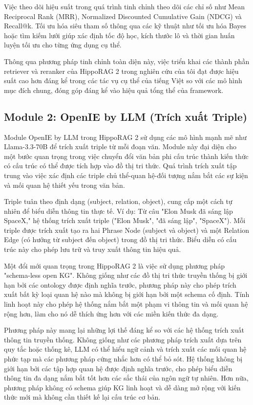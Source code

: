 \documentclass[../main.tex]{subfiles}
\begin{document}
Việc theo dõi hiệu suất trong quá trình tinh chỉnh theo dõi các chỉ số như Mean Reciprocal Rank (MRR), Normalized Discounted Cumulative Gain (NDCG) và Recall@k. Tối ưu hóa siêu tham số thông qua các kỹ thuật như tối ưu hóa Bayes hoặc tìm kiếm lưới giúp xác định tốc độ học, kích thước lô và thời gian huấn luyện tối ưu cho từng ứng dụng cụ thể.

Thông qua phương pháp tinh chỉnh toàn diện này, việc triển khai các thành phần retriever và reranker của HippoRAG 2 trong nghiên cứu của tôi đạt được hiệu suất cao hơn đáng kể trong các tác vụ cụ thể của tiếng Việt so với các mô hình mục đích chung, đóng góp đáng kể vào hiệu quả tổng thể của framework.

\subsection{Module 2: OpenIE by LLM (Trích xuất Triple)}
Module OpenIE by LLM trong HippoRAG 2 sử dụng các mô hình mạnh mẽ như Llama-3.3-70B để trích xuất triple từ mỗi đoạn văn. Module này đại diện cho một bước quan trọng trong việc chuyển đổi văn bản phi cấu trúc thành kiến thức có cấu trúc có thể được tích hợp vào đồ thị tri thức. Quá trình trích xuất tập trung vào việc xác định các triple chủ thể-quan hệ-đối tượng nắm bắt các sự kiện và mối quan hệ thiết yếu trong văn bản.

Triple tuân theo định dạng (subject, relation, object), cung cấp một cách tự nhiên để biểu diễn thông tin thực tế. Ví dụ: Từ câu "Elon Musk đã sáng lập SpaceX," hệ thống trích xuất triple ("Elon Musk", "đã sáng lập", "SpaceX"). Mỗi triple được trích xuất tạo ra hai Phrase Node (subject và object) và một Relation Edge (có hướng từ subject đến object) trong đồ thị tri thức. Biểu diễn có cấu trúc này cho phép lưu trữ và truy xuất thông tin hiệu quả.

Một đổi mới quan trọng trong HippoRAG 2 là việc sử dụng phương pháp "schema-less open KG". Không giống như các đồ thị tri thức truyền thống bị giới hạn bởi các ontology được định nghĩa trước, phương pháp này cho phép trích xuất bất kỳ loại quan hệ nào mà không bị giới hạn bởi một schema cố định. Tính linh hoạt này cho phép hệ thống nắm bắt một phạm vi thông tin và mối quan hệ rộng hơn, làm cho nó dễ thích ứng hơn với các miền kiến thức đa dạng.

Phương pháp này mang lại những lợi thế đáng kể so với các hệ thống trích xuất thông tin truyền thống. Không giống như các phương pháp trích xuất dựa trên quy tắc hoặc thống kê, LLM có thể hiểu ngữ cảnh và trích xuất các mối quan hệ phức tạp mà các phương pháp cứng nhắc hơn có thể bỏ sót. Hệ thống không bị giới hạn bởi các tập hợp quan hệ được định nghĩa trước, cho phép biểu diễn thông tin đa dạng nắm bắt tốt hơn các sắc thái của ngôn ngữ tự nhiên. Hơn nữa, phương pháp không có schema giúp KG linh hoạt và dễ dàng mở rộng với kiến thức mới mà không cần thiết kế lại cấu trúc cơ bản.
\end{document}
